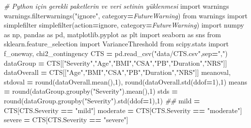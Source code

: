 \documentclass[12pt,twoside]{deuthesis}
\newenvironment{Shaded}{\begin{snugshade}}{\end{snugshade}}
\newcommand{\BuiltInTok}[1]{#1}
\newcommand{\CommentTok}[1]{\textcolor[rgb]{0.56,0.35,0.01}{\textit{#1}}}
\newcommand{\DecValTok}[1]{\textcolor[rgb]{0.00,0.00,0.81}{#1}}
\newcommand{\ImportTok}[1]{#1}
\newcommand{\NormalTok}[1]{#1}
\newcommand{\OperatorTok}[1]{\textcolor[rgb]{0.81,0.36,0.00}{\textbf{#1}}}
\newcommand{\PreprocessorTok}[1]{\textcolor[rgb]{0.56,0.35,0.01}{\textit{#1}}}
\newcommand{\StringTok}[1]{\textcolor[rgb]{0.31,0.60,0.02}{#1}}
\begin{document}
\begin{Shaded}
\begin{Highlighting}[]
\CommentTok{\# Python için gerekli paketlerin ve veri setinin yüklenmesi}
\ImportTok{import}\NormalTok{ warnings}
\NormalTok{warnings.filterwarnings(}\StringTok{"ignore"}\NormalTok{, category}\OperatorTok{=}\PreprocessorTok{FutureWarning}\NormalTok{)}
\ImportTok{from}\NormalTok{ warnings }\ImportTok{import}\NormalTok{ simplefilter}
\NormalTok{simplefilter(action}\OperatorTok{=}\StringTok{\textquotesingle{}ignore\textquotesingle{}}\NormalTok{, category}\OperatorTok{=}\PreprocessorTok{FutureWarning}\NormalTok{)}
\ImportTok{import}\NormalTok{ numpy }\ImportTok{as}\NormalTok{ np, pandas }\ImportTok{as}\NormalTok{ pd, matplotlib.pyplot }\ImportTok{as}\NormalTok{ plt}
\ImportTok{import}\NormalTok{ seaborn }\ImportTok{as}\NormalTok{ sns}
\ImportTok{from}\NormalTok{ sklearn.feature\_selection }\ImportTok{import}\NormalTok{ VarianceThreshold}
\ImportTok{from}\NormalTok{ scipy.stats }\ImportTok{import}\NormalTok{ f\_oneway, chi2\_contingency}
\NormalTok{CTS }\OperatorTok{=}\NormalTok{ pd.read\_csv(}\StringTok{"data/CTS.csv"}\NormalTok{,sep}\OperatorTok{=}\StringTok{","}\NormalTok{)}
\NormalTok{dataGroup }\OperatorTok{=}\NormalTok{ CTS[[}\StringTok{"Severity"}\NormalTok{,}\StringTok{"Age"}\NormalTok{,}\StringTok{"BMI"}\NormalTok{,}\StringTok{"CSA"}\NormalTok{,}\StringTok{"PB"}\NormalTok{,}\StringTok{"Duration"}\NormalTok{,}\StringTok{"NRS"}\NormalTok{]]}
\NormalTok{dataOverall }\OperatorTok{=}\NormalTok{ CTS[[}\StringTok{"Age"}\NormalTok{,}\StringTok{"BMI"}\NormalTok{,}\StringTok{"CSA"}\NormalTok{,}\StringTok{"PB"}\NormalTok{,}\StringTok{"Duration"}\NormalTok{,}\StringTok{"NRS"}\NormalTok{]]}
\NormalTok{meanoval, stdoval }\OperatorTok{=} \BuiltInTok{round}\NormalTok{(dataOverall.mean(),}\DecValTok{1}\NormalTok{), }\BuiltInTok{round}\NormalTok{(dataOverall.std(ddof}\OperatorTok{=}\DecValTok{1}\NormalTok{),}\DecValTok{1}\NormalTok{)}
\NormalTok{means }\OperatorTok{=} \BuiltInTok{round}\NormalTok{(dataGroup.groupby(}\StringTok{"Severity"}\NormalTok{).mean(),}\DecValTok{1}\NormalTok{)}
\NormalTok{stds }\OperatorTok{=} \BuiltInTok{round}\NormalTok{(dataGroup.groupby(}\StringTok{"Severity"}\NormalTok{).std(ddof}\OperatorTok{=}\DecValTok{1}\NormalTok{),}\DecValTok{1}\NormalTok{)}
\CommentTok{\#\#}
\NormalTok{mild }\OperatorTok{=}\NormalTok{ CTS[CTS.Severity }\OperatorTok{==} \StringTok{"mild"}\NormalTok{]}
\NormalTok{moderate }\OperatorTok{=}\NormalTok{ CTS[CTS.Severity }\OperatorTok{==} \StringTok{"moderate"}\NormalTok{]}
\NormalTok{severe }\OperatorTok{=}\NormalTok{ CTS[CTS.Severity }\OperatorTok{==} \StringTok{"severe"}\NormalTok{]}

\end{Highlighting}
\end{Shaded}
\end{document}
